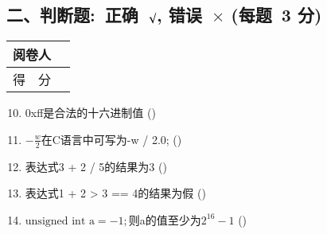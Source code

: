 \documentclass[twocolumn,landscape,UTF8]{ctexart}
\begin{document}
\begin{spacing}{1.3}
\section*{\hspace{4.5cm} 二、判断题:~正确~$\surd$, 错误~$\times$ (每题~3 分)}
\vspace{-1.5cm}
\begin{tabular}{|p{}|p{}|}
  \hline
    \centering 阅卷人&       \\
  \hline
    \centering 得~~分 &      \\
  \hline
\end{tabular}
\begin{enumerate}
\setcounter{enumi}{9}
    \item 0xff是合法的十六进制值                                 \hfill(\qquad)
    \item $-\frac{w}{2}$在C语言中可写为-w / 2.0;                \hfill(\qquad)
    \item 表达式3 + 2 / 5的结果为3                              \hfill(\qquad)
    \item 表达式1 + 2 > 3 == 4的结果为假                         \hfill(\qquad)
    \item	 $\text{unsigned int a} = -1;$则a的值至少为$2^{16}-1$  \hfill(\qquad)
\end{enumerate}

\end{spacing}
\end{document}
